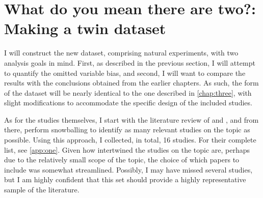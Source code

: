 






\section{What do you mean there are two?: Making a twin dataset}
\label{sec:twins_data}

I will construct the new dataset, comprising natural experiments, with two analysis goals in mind. First, as described in the previous section, I will attempt to quantify the omitted variable bias, and second, I will want to compare the results with the conclusions obtained from the earlier chapters. As such, the form of the dataset will be nearly identical to the one described in \autoref{chap:three}, with slight modifications to accommodate the specific design of the included studies.

As for the studies themselves, I start with the literature review of \cite{nakamuro2012estimating} and \cite{li2012estimating}, and from there, perform snowballing to identify as many relevant studies on the topic as possible. Using this approach, I collected, in total, 16 studies. For their complete list, see \autoref{app:one}.  Given how intertwined the studies on the topic are, perhaps due to the relatively small scope of the topic, the choice of which papers to include was somewhat streamlined. Possibly, I may have missed several studies, but I am highly confident that this set should provide a highly representative sample of the literature.


